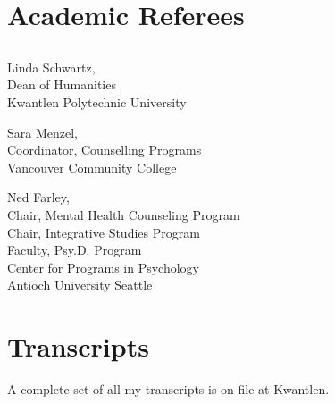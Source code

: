 \documentclass[10pt,DIV09,letterpaper,oneside,headsepline]{scrreprt}
\begin{document}
\chapter{Academic Referees}

\section*{}

\begin{flushleft}
Linda Schwartz,\\
Dean of Humanities\\
Kwantlen Polytechnic University\end{flushleft}

\vspace{\baselineskip}

\begin{flushleft}

Sara Menzel,\\
Coordinator, Counselling Programs\\
Vancouver Community College

\end{flushleft}

\vspace{\baselineskip}

\begin{flushleft}

Ned Farley,\\
Chair, Mental Health Counseling Program\\
Chair, Integrative Studies Program\\
Faculty, Psy.D. Program\\
Center for Programs in Psychology\\
Antioch University Seattle\\

\end{flushleft}

\chapter{Transcripts}

A complete set of all my transcripts is on file at Kwantlen.
\end{document}
